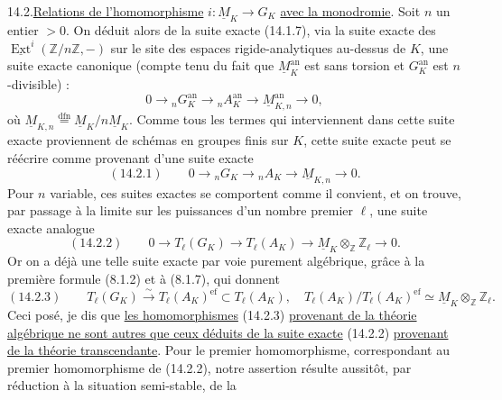 14.2.\quad\uline{Relations de l'homomorphisme} $i:\underline M_K\longrightarrow G_K$
\uline{avec la monodromie}. Soit $n$ un entier $>0$. On déduit alors de la suite exacte (14.1.7), via la
suite exacte des $\underline{\operatorname{Ext}}^i(\mathbb Z/n\mathbb Z,-)$ sur le site des espaces rigide-analytiques
au-dessus de $K$, une suite exacte canonique (compte tenu du fait que
$\underline M_K^{\mathrm{an}}$ est sans torsion et $G_K^{\mathrm{an}}$ est $n$-divisible) :
\[
0\longrightarrow{}_nG_K^{\mathrm{an}}\longrightarrow{}_nA_K^{\mathrm{an}}
\longrightarrow\underline M_{K,n}^{\mathrm{an}}\longrightarrow0,
\]
où $\underline M_{K,n}\overset{\mathrm{dfn}}=\underline M_K/n\underline M_K$.
Comme tous les termes qui interviennent dans cette suite exacte proviennent de schémas en groupes finis sur $K$,
cette suite exacte peut se réécrire comme provenant d'une suite exacte
\[
(14.2.1)\qquad0\longrightarrow{}_nG_K\longrightarrow{}_nA_K
\longrightarrow\underline M_{K,n}\longrightarrow0.
\]
Pour $n$ variable, ces suites exactes se comportent comme il convient,
et on trouve, par passage à la limite sur les puissances d'un nombre premier $\ell$, une suite exacte analogue
\[
(14.2.2)\qquad0\longrightarrow T_\ell(G_K)\longrightarrow T_\ell(A_K)
\longrightarrow\underline M_K\otimes_{\mathbb Z}\mathbb Z_\ell\longrightarrow0.
\]
Or on a déjà une telle suite exacte par voie purement algébrique, grâce
à la première formule (8.1.2) et à (8.1.7), qui donnent
\[
(14.2.3)\qquad T_\ell(G_K)\xrightarrow{\sim}T_\ell(A_K)^{\mathrm{ef}}\subset T_\ell(A_K),
\quad T_\ell(A_K)/T_\ell(A_K)^{\mathrm{ef}}\simeq\underline M_K\otimes_{\mathbb Z}\mathbb Z_\ell.
\]
Ceci posé, je dis que \uline{les homomorphismes} (14.2.3)
\uline{provenant de la théorie algébrique ne sont autres que ceux déduits de la suite exacte} (14.2.2)
\uline{provenant de la théorie transcendante}. Pour le premier homomorphisme,
correspondant au premier homomorphisme de (14.2.2), notre assertion
résulte aussitôt, par réduction à la situation semi-stable, de la
